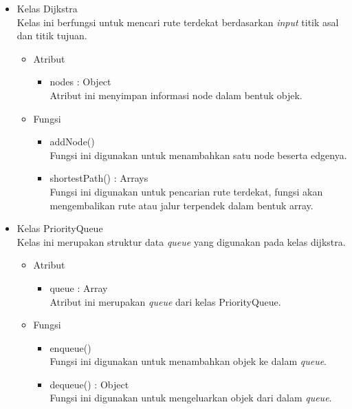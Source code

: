 \begin{itemize}
  \item Kelas Dijkstra\\
  Kelas ini berfungsi untuk mencari rute terdekat berdasarkan \textit{input}
  titik asal dan titik tujuan.
  \begin{itemize}
    \item Atribut
    \begin{itemize}
      \item nodes : Object\\
      Atribut ini menyimpan informasi node dalam bentuk objek.
    \end{itemize}
  \end{itemize}
  \begin{itemize}
    \item Fungsi
    \begin{itemize}
      \item addNode()\\
      Fungsi ini digunakan untuk menambahkan satu node beserta edgenya.
      
      \item shortestPath() : Arrays\\
      Fungsi ini digunakan untuk pencarian rute terdekat, fungsi akan
      mengembalikan rute atau jalur terpendek dalam bentuk array.
    \end{itemize}
  \end{itemize}
  
  \item Kelas PriorityQueue\\
  Kelas ini merupakan struktur data \textit{queue} yang digunakan pada
  kelas dijkstra.
  \begin{itemize}
    \item Atribut
    \begin{itemize}
      \item queue : Array\\
      Atribut ini merupakan \textit{queue} dari kelas PriorityQueue.
    \end{itemize}
  \end{itemize}
  \begin{itemize}
    \item Fungsi
    \begin{itemize}
      \item enqueue()\\
      Fungsi ini digunakan untuk menambahkan objek ke dalam \textit{queue}.
      
      \item dequeue() : Object\\
      Fungsi ini digunakan untuk mengeluarkan objek dari dalam \textit{queue}.
      

\end{itemize}
\end{itemize}
\end{itemize}
